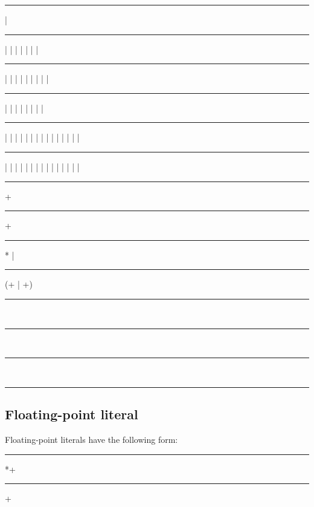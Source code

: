 \begin{grammar}
\rule{binary-digit}  | \\
\rule{octal-digit}  |  |  |  |  |  |  | \\
\rule{decimal-digit}  |  |  |  |  |  |  |  |  | \\
\rule{nonzero-decimal-digit}  |  |  |  |  |  |  |  | \\
\rule{lowercase-hex-digit}  |  |  |  |  |  |  |  |  |  |  |  |  |  |  | \\
\rule{uppercase-hex-digit}  |  |  |  |  |  |  |  |  |  |  |  |  |  |  | 

\rule{binary-integer-literal} +\\
\rule{octal-integer-literal} +\\
\rule{decimal-integer-literal}  * | \\
\rule{hex-integer-literal} (+ | +)

\rule{integer-literal} \\
\rule{integer-literal} \\
\rule{integer-literal} \\
\rule{integer-literal} 
\end{grammar}

\subsection{Floating-point literal}

Floating-point literals have the following form:

\begin{grammar}
\rule{floating-point-literal}  *+\\
\rule{floating-point-literal} +
\end{grammar}

